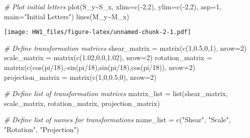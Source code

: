 \documentclass[
]{article}
\newenvironment{Shaded}{\begin{snugshade}}{\end{snugshade}}
\newcommand{\AttributeTok}[1]{\textcolor[rgb]{0.77,0.63,0.00}{#1}}
\newcommand{\CommentTok}[1]{\textcolor[rgb]{0.56,0.35,0.01}{\textit{#1}}}
\newcommand{\DecValTok}[1]{\textcolor[rgb]{0.00,0.00,0.81}{#1}}
\newcommand{\FloatTok}[1]{\textcolor[rgb]{0.00,0.00,0.81}{#1}}
\newcommand{\FunctionTok}[1]{\textcolor[rgb]{0.00,0.00,0.00}{#1}}
\newcommand{\NormalTok}[1]{#1}
\newcommand{\OtherTok}[1]{\textcolor[rgb]{0.56,0.35,0.01}{#1}}
\newcommand{\SpecialCharTok}[1]{\textcolor[rgb]{0.00,0.00,0.00}{#1}}
\newcommand{\StringTok}[1]{\textcolor[rgb]{0.31,0.60,0.02}{#1}}
\begin{document}
\begin{Shaded}
\begin{Highlighting}[]
\CommentTok{\# Plot initial letters}
\FunctionTok{plot}\NormalTok{(S\_y}\SpecialCharTok{\textasciitilde{}}\NormalTok{S\_x, }\AttributeTok{xlim=}\FunctionTok{c}\NormalTok{(}\SpecialCharTok{{-}}\DecValTok{2}\NormalTok{,}\DecValTok{2}\NormalTok{), }\AttributeTok{ylim=}\FunctionTok{c}\NormalTok{(}\SpecialCharTok{{-}}\DecValTok{2}\NormalTok{,}\DecValTok{2}\NormalTok{), }\AttributeTok{asp=}\DecValTok{1}\NormalTok{, }\AttributeTok{main=}\StringTok{"Initial Letters"}\NormalTok{)}
\FunctionTok{lines}\NormalTok{(M\_y}\SpecialCharTok{\textasciitilde{}}\NormalTok{M\_x)}
\end{Highlighting}
\end{Shaded}

\texttt{[image: HW1\_files/figure-latex/unnamed-chunk-2-1.pdf]}

\begin{Shaded}
\begin{Highlighting}[]
\CommentTok{\# Define transformation matrices}
\NormalTok{shear\_matrix }\OtherTok{=} \FunctionTok{matrix}\NormalTok{(}\FunctionTok{c}\NormalTok{(}\DecValTok{1}\NormalTok{,}\FloatTok{0.5}\NormalTok{,}\DecValTok{0}\NormalTok{,}\DecValTok{1}\NormalTok{), }\AttributeTok{nrow=}\DecValTok{2}\NormalTok{)}
\NormalTok{scale\_matrix }\OtherTok{=} \FunctionTok{matrix}\NormalTok{(}\FunctionTok{c}\NormalTok{(}\FloatTok{1.02}\NormalTok{,}\DecValTok{0}\NormalTok{,}\DecValTok{0}\NormalTok{,}\FloatTok{1.02}\NormalTok{), }\AttributeTok{nrow=}\DecValTok{2}\NormalTok{)}
\NormalTok{rotation\_matrix }\OtherTok{=} \FunctionTok{matrix}\NormalTok{(}\FunctionTok{c}\NormalTok{(}\FunctionTok{cos}\NormalTok{(pi}\SpecialCharTok{/}\DecValTok{18}\NormalTok{),}\SpecialCharTok{{-}}\FunctionTok{sin}\NormalTok{(pi}\SpecialCharTok{/}\DecValTok{18}\NormalTok{),}\FunctionTok{sin}\NormalTok{(pi}\SpecialCharTok{/}\DecValTok{18}\NormalTok{),}\FunctionTok{cos}\NormalTok{(pi}\SpecialCharTok{/}\DecValTok{18}\NormalTok{)), }\AttributeTok{nrow=}\DecValTok{2}\NormalTok{)}
\NormalTok{projection\_matrix }\OtherTok{=} \FunctionTok{matrix}\NormalTok{(}\FunctionTok{c}\NormalTok{(}\DecValTok{1}\NormalTok{,}\DecValTok{0}\NormalTok{,}\FloatTok{0.5}\NormalTok{,}\DecValTok{0}\NormalTok{), }\AttributeTok{nrow=}\DecValTok{2}\NormalTok{)}

\CommentTok{\# Define list of transformation matrices}
\NormalTok{matrix\_list }\OtherTok{=} \FunctionTok{list}\NormalTok{(shear\_matrix, scale\_matrix, rotation\_matrix, projection\_matrix)}

\CommentTok{\# Define list of names for transformations}
\NormalTok{name\_list }\OtherTok{=} \FunctionTok{c}\NormalTok{(}\StringTok{"Shear"}\NormalTok{, }\StringTok{"Scale"}\NormalTok{, }\StringTok{"Rotation"}\NormalTok{, }\StringTok{"Projection"}\NormalTok{)}


\end{Highlighting}
\end{Shaded}
\end{document}
